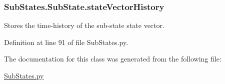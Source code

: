 \subsubsection[{\texorpdfstring{state\+Vector\+History}{stateVectorHistory}}]{\setlength{\rightskip}{0pt plus 5cm}Sub\+States.\+Sub\+State.\+state\+Vector\+History}\hypertarget{classSubStates_1_1SubState_a24bf2de56fc3037d91cba43d28f3bf60}{}\label{classSubStates_1_1SubState_a24bf2de56fc3037d91cba43d28f3bf60}


Stores the time-\/history of the sub-\/state state vector. 



Definition at line 91 of file Sub\+States.\+py.



The documentation for this class was generated from the following file\+:\begin{DoxyCompactItemize}
\item 
\hyperlink{SubStates_8py}{Sub\+States.\+py}\end{DoxyCompactItemize}
